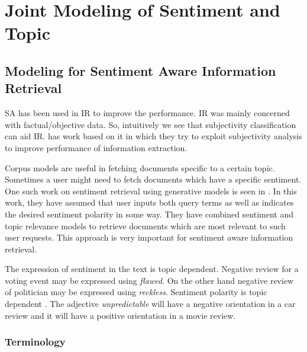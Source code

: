
\chapter{Joint Modeling of Sentiment and Topic} %

\label{Chapter4} %



\section{Modeling for Sentiment Aware Information Retrieval}

SA has been used in IR to improve the performance. IR was mainly concerned with factual/objective data. So, intuitively we see
that subjectivity classification can aid IR. \citep*{riloff2005exploiting} has work based on it in which they try to exploit
subjectivity analysis to improve performance of information extraction. 

Corpus models are useful in fetching documents specific to a certain topic. Sometimes a user might need to fetch documents which
have a specific sentiment. One such work on sentiment retrieval using generative models is seen in \citep*{eguchi2006sentiment}.
In this work, they have assumed that user inputs both query terms as well as indicates the desired sentiment polarity in some way.
They have combined sentiment and topic relevance models to retrieve documents which are most relevant to such user requests. This
approach is very important for sentiment aware information retrieval.

The expression of sentiment in the text is topic dependent. Negative review for a voting event may be expressed using \textit{flawed}. 
On the other hand negative review of politician may be expressed using \textit{reckless}. Sentiment polarity is topic dependent \citep*{engstrom2004topic}.
The adjective \textit{unpredictable} will have a negative orientation in a car review and it will have a positive orientation in a
movie review. 

\subsection*{Terminology}

